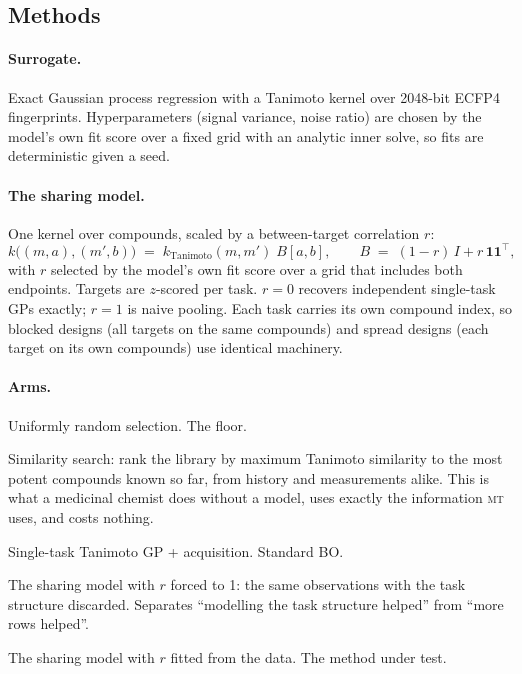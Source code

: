 \documentclass[11pt]{article}
\newcommand{\stl}{\textsc{stl}}
\newcommand{\mt}{\textsc{mt}}
\newcommand{\pooled}{\textsc{pooled}}
\newcommand{\simarm}{\textsc{sim}}
\newcommand{\rnd}{\textsc{rand}}
\begin{document}
\subsection{Methods}

\paragraph{Surrogate.} Exact Gaussian process regression with a Tanimoto kernel
over 2048-bit ECFP4 fingerprints. Hyperparameters (signal variance, noise ratio)
are chosen by the model's own fit score over a fixed grid with an analytic
inner solve, so fits are deterministic given a seed.

\paragraph{The sharing model.} One kernel over compounds, scaled by a
between-target correlation $r$:
\[
  k\big((m, a), (m', b)\big) \;=\; k_{\mathrm{Tanimoto}}(m, m')\; B[a, b],
  \qquad
  B \;=\; (1 - r)\,I + r\,\mathbf{1}\mathbf{1}^{\!\top},
\]
with $r$ selected by the model's own fit score over a grid that includes both
endpoints. Targets are $z$-scored per task. $r = 0$ recovers independent
single-task GPs exactly; $r = 1$ is naive pooling. Each task carries its own
compound index, so blocked designs (all targets on the same compounds) and
spread designs (each target on its own compounds) use identical machinery.

\paragraph{Arms.}
\begin{description}[leftmargin=2em,style=nextline,itemsep=0.2em]
  \item[\rnd] Uniformly random selection. The floor.
  \item[\simarm] Similarity search: rank the library by maximum Tanimoto
    similarity to the most potent compounds known so far, from history and
    measurements alike. This is what a medicinal chemist does without a model,
    uses exactly the information \mt{} uses, and costs nothing.
  \item[\stl] Single-task Tanimoto GP + acquisition. Standard BO.
  \item[\pooled] The sharing model with $r$ forced to 1: the same observations
    with the task structure discarded. Separates ``modelling the task structure
    helped'' from ``more rows helped''.
  \item[\mt] The sharing model with $r$ fitted from the data. The method under test.
\end{description}
\end{document}
